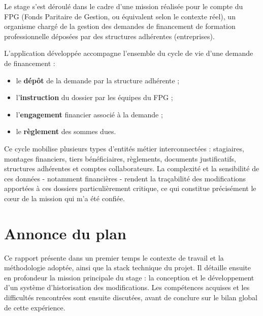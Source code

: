 Le stage s'est déroulé dans le cadre d'une mission réalisée pour le
compte du FPG (Fonds Paritaire de Gestion, ou équivalent selon le
contexte réel), un organisme chargé de la gestion des demandes de
financement de formation professionnelle déposées par des structures
adhérentes (entreprises).

L'application développée accompagne l'ensemble du cycle de vie d'une
demande de financement :

\begin{itemize}
  \item le \textbf{dépôt} de la demande par la structure adhérente ;
  \item l'\textbf{instruction} du dossier par les équipes du FPG ;
  \item l'\textbf{engagement} financier associé à la demande ;
  \item le \textbf{règlement} des sommes dues.
\end{itemize}

Ce cycle mobilise plusieurs types d'entités métier interconnectées :
stagiaires, montages financiers, tiers bénéficiaires, règlements,
documents justificatifs, structures adhérentes et comptes collaborateurs.
La complexité et la sensibilité de ces données  -  notamment financières  - 
rendent la traçabilité des modifications apportées à ces dossiers
particulièrement critique, ce qui constitue précisément le cœur de la
mission qui m'a été confiée.

\section{Annonce du plan}

Ce rapport présente dans un premier temps le contexte de travail et la
méthodologie adoptée, ainsi que la stack technique du projet. Il détaille
ensuite en profondeur la mission principale du stage : la conception et
le développement d'un système d'historisation des modifications. Les
compétences acquises et les difficultés rencontrées sont ensuite
discutées, avant de conclure sur le bilan global de cette expérience.
